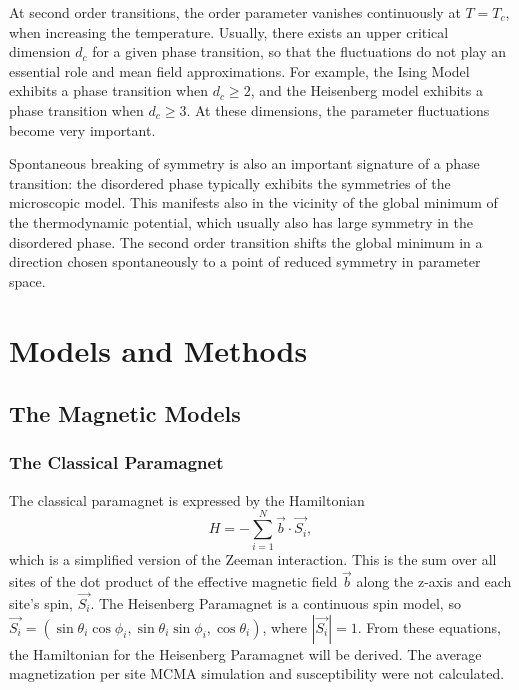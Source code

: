 \documentclass[a4paper,12pt]{article}
\begin{document}
At second order transitions, the order parameter vanishes continuously at $T = T_c$, when increasing the temperature. Usually, there exists an upper critical dimension $d_c$ for a given phase transition, so that the fluctuations do not play an essential role and mean field approximations. For example, the Ising Model exhibits a phase transition when $d_c \geq 2$, and the Heisenberg model exhibits a phase transition when $d_c \geq 3$. At these dimensions, the parameter fluctuations become very important.

Spontaneous breaking of symmetry is also an important signature of a phase
transition: the disordered phase typically exhibits the symmetries of the microscopic model. This manifests also in the vicinity of the global minimum of the thermodynamic potential, which usually also has large symmetry in the disordered phase. The second order transition shifts the global minimum in a direction chosen spontaneously to a point of reduced symmetry in parameter space. \cite{dissertation}


\section{Models and Methods}

\subsection{The Magnetic Models}
	\subsubsection{The Classical Paramagnet}
	The classical paramagnet is expressed by the Hamiltonian
	\begin{equation}\label{eq:zeeman}
		H = -\sum_{i=1}^N{\vec{b}\cdot\vec{S_i}},
	\end{equation}
	which is a simplified version of the Zeeman interaction. This is the sum over all sites of the dot product of the effective magnetic field $\vec{b}$ along the z-axis and each site's spin, $\vec{S_i}$. The Heisenberg Paramagnet is a continuous spin model, so $\vec{S_i} = (\sin\theta_i\cos\phi_i, \sin\theta_i\sin\phi_i, \cos\theta_i)$, where $|\vec{S_i}| = 1$.  From these equations, the Hamiltonian for the Heisenberg Paramagnet will be derived. The average magnetization per site MCMA simulation and susceptibility were not calculated.
\end{document}
